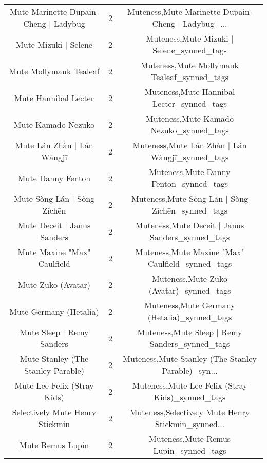 \begin{table}[h!]
{\begin{tabular}{|c|c|c|}
             Mute Marinette Dupain-Cheng | Ladybug &          2 & Muteness,Mute Marinette Dupain-Cheng | Ladybug\_... \\
                              Mute Mizuki | Selene &          2 &          Muteness,Mute Mizuki | Selene\_synned\_tags \\
                            Mute Mollymauk Tealeaf &          2 &        Muteness,Mute Mollymauk Tealeaf\_synned\_tags \\
                              Mute Hannibal Lecter &          2 &          Muteness,Mute Hannibal Lecter\_synned\_tags \\
                                Mute Kamado Nezuko &          2 &            Muteness,Mute Kamado Nezuko\_synned\_tags \\
                        Mute Lán Zhàn | Lán Wàngjī &          2 &    Muteness,Mute Lán Zhàn | Lán Wàngjī\_synned\_tags \\
                                 Mute Danny Fenton &          2 &             Muteness,Mute Danny Fenton\_synned\_tags \\
                       Mute Sòng Lán | Sòng Zǐchēn &          2 &   Muteness,Mute Sòng Lán | Sòng Zǐchēn\_synned\_tags \\
                       Mute Deceit | Janus Sanders &          2 &   Muteness,Mute Deceit | Janus Sanders\_synned\_tags \\
                       Mute Maxine "Max" Caulfield &          2 &   Muteness,Mute Maxine "Max" Caulfield\_synned\_tags \\
                                Mute Zuko (Avatar) &          2 &            Muteness,Mute Zuko (Avatar)\_synned\_tags \\
                            Mute Germany (Hetalia) &          2 &        Muteness,Mute Germany (Hetalia)\_synned\_tags \\
                         Mute Sleep | Remy Sanders &          2 &     Muteness,Mute Sleep | Remy Sanders\_synned\_tags \\
                Mute Stanley (The Stanley Parable) &          2 & Muteness,Mute Stanley (The Stanley Parable)\_syn... \\
                       Mute Lee Felix (Stray Kids) &          2 &   Muteness,Mute Lee Felix (Stray Kids)\_synned\_tags \\
                   Selectively Mute Henry Stickmin &          2 & Muteness,Selectively Mute Henry Stickmin\_synned... \\
                                  Mute Remus Lupin &          2 &              Muteness,Mute Remus Lupin\_synned\_tags \\

\end{tabular}}
\end{table}
